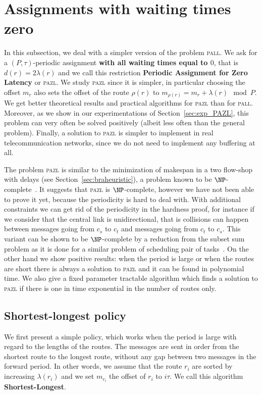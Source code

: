 \documentclass[10pt, conference, letterpaper]{IEEEtran}
\newcommand\pazl{\textsc{pazl}\xspace}
\newcommand\pall{\textsc{pall}\xspace}
\begin{document}
\section{Assignments with waiting times zero} \label{sec:PAZL}
  
  In this subsection, we deal with a simpler version of the problem \pall.
  We ask for a $(P,\tau)$-periodic assignment {\bf with all waiting times equal to $0$}, that is $d(r) = 2\lambda(r)$ and we call this restriction {\bf Periodic Assignment for Zero Latency} or \pazl. We study \pazl since it is simpler, in particular 
  choosing the offset $m_r$ also sets the offset of the route $\rho(r)$ to $m_{\rho(r)} = m_{r} + \lambda(r) \mod P$.
  We get better theoretical results and practical algorithms for \pazl than for \pall. Moreover, as we show in our experimentations of Section~\ref{sec:exp_PAZL}, this problem can very often be solved positively (albeit less often than the general problem). Finally, a solution to \pazl is simpler to implement in real telecommunication networks, since we do not need to implement any buffering at all.    
  
   The problem \pazl is similar to the minimization of makespan in a two flow-shop with delays (see Section~\ref{sec:braheuristic}), a problem known to be $\NP$-complete~\cite{yu2004minimizing}. It suggests that \pazl is $\NP$-complete, however we have not been able to prove it yet,  because the periodicity is hard to deal with. With additional constraints we can get rid of the periodicity in the hardness proof, for instance if we consider that the central link is unidirectional, that is collisions can happen between messages going from $c_s$ to $c_t$ and messages  going from $c_t$ to $c_s$. This variant can be shown to be $\NP$-complete by a reduction from the subset sum problem as it is done for a similar problem of scheduling pair of tasks~\cite{orman1997complexity}.
  On the other hand we show positive results:  when the period is large or when the routes are short there is always a solution to \pazl and it can be found in polynomial time. We also give a fixed parameter tractable algorithm which finds a solution to \pazl if there is one in time exponential in the number of routes only. 
  
\subsection{Shortest-longest policy}
    

    We first present a simple policy, which works when the period is large with regard to the lengths of the routes.
    The messages are sent in order from the shortest route to the longest route, without any gap between two messages in the forward period.
    In other words, we assume that the route $r_i$ are sorted by increasing $\lambda(r_i)$ and we set $m_{r_i}$ the offset of $r_i$ to $i\tau$. We call this algorithm {\bf Shortest-Longest}.
      
\end{document}
